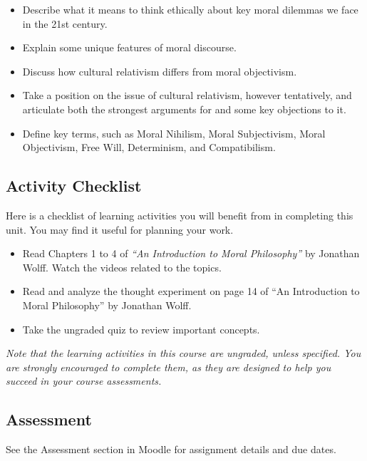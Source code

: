 \documentclass[
]{book}
\providecommand{\tightlist}{%
  \setlength{\itemsep}{0pt}\setlength{\parskip}{0pt}}
\begin{document}
\begin{itemize}
\tightlist
\item
  Describe what it means to think ethically about key moral dilemmas we face in the 21st century.
\item
  Explain some unique features of moral discourse.
\item
  Discuss how cultural relativism differs from moral objectivism.
\item
  Take a position on the issue of cultural relativism, however tentatively, and articulate both the strongest arguments for and some key objections to it.
\item
  Define key terms, such as Moral Nihilism, Moral Subjectivism, Moral Objectivism, Free Will, Determinism, and Compatibilism.
\end{itemize}

\hypertarget{activity-checklist}{%
\subsection*{Activity Checklist}\label{activity-checklist}}

Here is a checklist of learning activities you will benefit from in completing this unit. You may find it useful for planning your work.

\begin{itemize}
\tightlist
\item
  Read Chapters 1 to 4 of \emph{``An Introduction to Moral Philosophy''} by Jonathan Wolff. Watch the videos related to the topics.
\item
  Read and analyze the thought experiment on page 14 of ``An Introduction to Moral Philosophy'' by Jonathan Wolff.
\item
  Take the ungraded quiz to review important concepts.
\end{itemize}

\emph{Note that the learning activities in this course are ungraded, unless specified. You are strongly encouraged to complete them, as they are designed to help you succeed in your course assessments.}

\hypertarget{assessment}{%
\subsection*{Assessment}\label{assessment}}

See the Assessment section in Moodle for assignment details and due dates.
\end{document}
